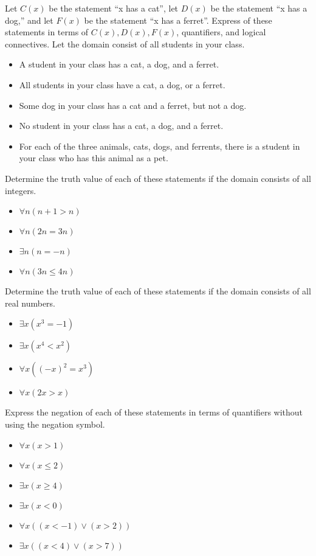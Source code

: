 \documentclass{article}
\newenvironment{problem}[2][Problem]{\begin{trivlist}
\item[\hskip \labelsep {\bfseries #1}\hskip \labelsep {\bfseries #2.}]}{\end{trivlist}}
\begin{document}
\begin{problem}{4}
Let $C(x)$ be the statement ``x has a cat'', let $D(x)$ be the statement ``x has a dog,'' and let $F(x)$ be the statement ``x has a ferret''. Express of these statements in terms of $C(x), D(x), F(x)$, quantifiers, and logical connectives.
Let the domain consist of all students in your class.
\begin{itemize}
    \item[(a)] A student in your class has a cat, a dog, and a ferret.
    \item[(b)] All students in your class have a cat, a dog, or a ferret.
    \item[(c)] Some dog in your class has a cat and a ferret, but not a dog.
    \item[(d)] No student in your class has a cat, a dog, and a ferret.
    \item[(e)] For each of the three animals, cats, dogs, and ferrents, there is a student in your class who has this animal as a pet.
\end{itemize}
\end{problem}

\begin{problem}{5}
Determine the truth value of each of these statements if the domain consists of all integers.
\begin{itemize}
    \item[(a)] $\forall n (n + 1 > n)$
    \item[(b)] $\forall n (2n = 3n) $
    \item[(c)] $\exists n (n = -n)$
    \item[(d)] $\forall n (3n \leq 4n) $
\end{itemize}
\end{problem}

\begin{problem}{6}
Determine the truth value of each of these statements if the domain consists of all real numbers.
\begin{itemize}
    \item[(a)] $\exists x (x^3 = -1)$
    \item[(b)] $\exists x (x^4 < x^2) $
    \item[(c)] $\forall x ((-x)^2 = x^3)$
    \item[(d)] $\forall x (2x >  x) $
\end{itemize}

\end{problem}
\begin{problem}{7}
Express the negation of each of these statements in terms of quantifiers without using the negation symbol.
\begin{itemize}
    \item[(a)] $\forall x ( x > 1) $
    \item[(b)] $\forall x ( x \leq 2) $
    \item[(c)] $\exists x (x \geq 4)$
    \item[(d)] $\exists x (x < 0) $
    \item[(e)] $\forall x ((x < -1) \lor (x > 2)) $
    \item[(f)] $\exists x ((x<4)\lor(x>7))$
\end{itemize}
\end{problem}
\end{document}
